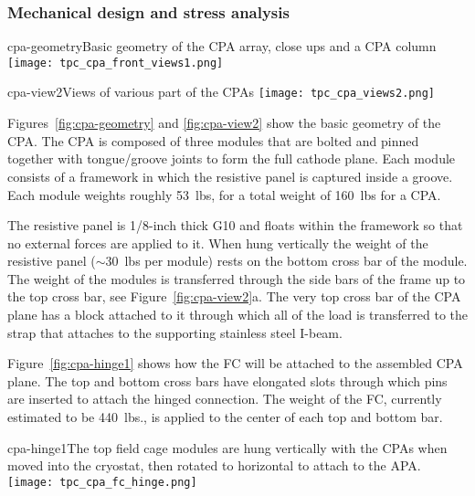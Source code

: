 \subsubsection{Mechanical design and stress analysis}


\begin{cdrfigure}{cpa-geometry}{Basic geometry of the CPA array, close ups and a CPA column} 
\texttt{[image: tpc\_cpa\_front\_views1.png]}
\end{cdrfigure}

\begin{cdrfigure}{cpa-view2}{Views of various part of the CPAs} 
\texttt{[image: tpc\_cpa\_views2.png]}
\end{cdrfigure}


Figures~\ref{fig:cpa-geometry} and \ref{fig:cpa-view2} show the basic geometry of the CPA.  The CPA is composed of three modules that are bolted and pinned together with tongue/groove joints to form the full cathode plane.  Each module consists of a framework in which the resistive panel is captured inside a groove.  Each module weights roughly 53~lbs, for a total weight of 160~lbs for a CPA.  

The resistive panel is 1/8-inch thick G10 and floats within the framework so that no external forces are applied to it.  When hung vertically the weight of the resistive panel ($\sim$30~lbs per module) rests on the bottom cross bar of the module.  The weight of the modules is transferred through the side bars of the frame  up to the top cross bar, see Figure~\ref{fig:cpa-view2}a.  The very top cross bar of the CPA plane has a block attached to it through which all of the load is transferred to the strap that attaches to the supporting stainless steel I-beam.  

Figure~\ref{fig:cpa-hinge1} shows how the FC will be attached to the assembled CPA plane.  The top and bottom cross bars have elongated slots through which pins are inserted to attach the hinged connection.  The weight of the FC, currently estimated to be 440~lbs., is applied to the center of each top and bottom bar.  

\begin{cdrfigure}{cpa-hinge1}{The top field cage modules are hung vertically with the CPAs when moved into the cryostat, then rotated to horizontal to attach to the APA.} 
\texttt{[image: tpc\_cpa\_fc\_hinge.png]}
\end{cdrfigure}


